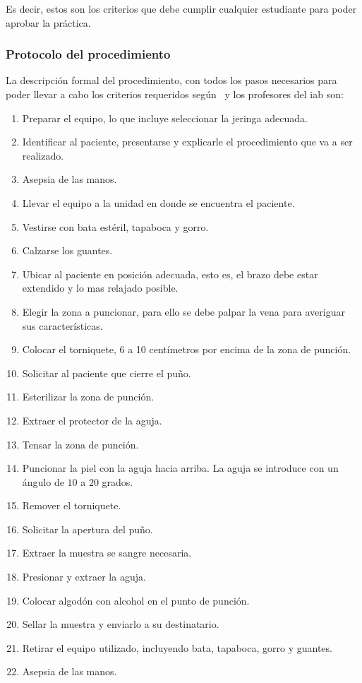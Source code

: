 Es decir, estos son los criterios que debe cumplir cualquier estudiante
para poder aprobar la práctica.

\subsubsection{Protocolo del procedimiento}
\label{sec:hemocultivo_protocolo}

La descripción formal del procedimiento, con todos los pasos necesarios
para poder llevar a cabo los criterios requeridos según~\cite{oms:extraccion}
y los profesores del \Gls{iab} son:

\begin{enumerate}
\item Preparar el equipo, lo que incluye seleccionar la jeringa adecuada.
\item Identificar al paciente, presentarse y explicarle el procedimiento que va
    a ser realizado.
\item Asepsia de las manos.
\item Llevar el equipo a la unidad en donde se encuentra el paciente.
\item Vestirse con bata estéril, tapaboca y gorro.
\item Calzarse los guantes.
\item Ubicar al paciente en posición adecuada, esto es, el brazo debe estar
    extendido y lo mas relajado posible.
\item Elegir la zona a puncionar, para ello se debe palpar la vena para
    averiguar sus características.
\item Colocar el torniquete, 6 a 10 centímetros por encima de la zona de
    punción.
\item Solicitar al paciente que cierre el puño.
\item Esterilizar la zona de punción.
\item Extraer el protector de la aguja.
\item Tensar la zona de punción.
\item Puncionar la piel con la aguja hacia arriba. La aguja se introduce con un
    ángulo de $10$ a $20$ grados.
\item Remover el torniquete.
\item Solicitar la apertura del puño.
\item Extraer la muestra se sangre necesaria.
\item Presionar y extraer la aguja.
\item Colocar algodón con alcohol en el punto de punción.
\item Sellar la muestra y enviarlo a su destinatario.
\item Retirar el equipo utilizado, incluyendo bata, tapaboca, gorro y guantes.
\item Asepsia de las manos.
\end{enumerate}

